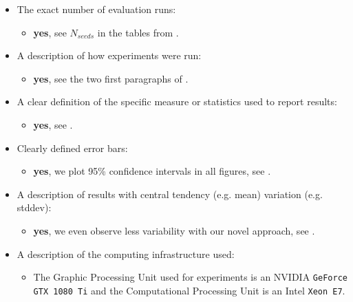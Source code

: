 \begin{itemize}
    \item The exact number of evaluation runs: 
    
        \begin{itemize}
            \item \textbf{yes}, see $N_{seeds}$ in the tables from .
        \end{itemize}

    \item A description of how experiments were run:              \begin{itemize}
            \item \textbf{yes}, see the two first paragraphs of .
        \end{itemize}

    \item A clear definition of the specific measure or statistics used to report results:
        \begin{itemize}
            \item  \textbf{yes}, see .
        \end{itemize}

    \item Clearly defined error bars:
    
        \begin{itemize}
            \item  \textbf{yes}, we plot 95\% confidence intervals in all figures, see .
        \end{itemize}

    \item A description of results with central tendency (e.g. mean)  variation (e.g. stddev):
    
        \begin{itemize}
            \item  \textbf{yes}, we even observe less variability with our novel approach, see .
        \end{itemize}
    \item A description of the computing infrastructure used:     \begin{itemize}
            \item The Graphic Processing Unit used for experiments is an NVIDIA \texttt{GeForce GTX 1080 Ti} and the Computational Processing Unit is an Intel \texttt{Xeon E7}.
        \end{itemize}
\end{itemize}